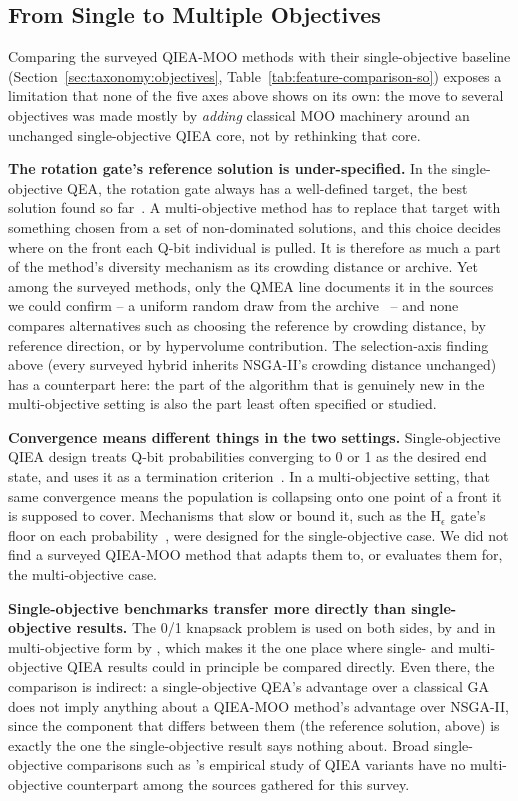 \subsection{From Single to Multiple Objectives}
\label{sec:critical-analysis:so-to-mo}

Comparing the surveyed QIEA-MOO methods with their single-objective
baseline (Section~\ref{sec:taxonomy:objectives},
Table~\ref{tab:feature-comparison-so}) exposes a limitation that none of
the five axes above shows on its own: the move to several objectives was
made mostly by \emph{adding} classical MOO machinery around an unchanged
single-objective QIEA core, not by rethinking that core.

\textbf{The rotation gate's reference solution is under-specified.} In
the single-objective QEA, the rotation gate always has a well-defined
target, the best solution found so far~\citep{han2002qea}. A
multi-objective method has to replace that target with something chosen
from a set of non-dominated solutions, and this choice decides where on
the front each Q-bit individual is pulled. It is therefore as much a
part of the method's diversity mechanism as its crowding distance or
archive. Yet among the surveyed methods, only the QMEA line documents
it in the sources we could confirm -- a uniform random draw from the archive~\citep{ryu2014dmqea} -- and
none compares alternatives such as choosing the reference by crowding
distance, by reference direction, or by hypervolume contribution. The
selection-axis finding above (every surveyed hybrid inherits NSGA-II's
crowding distance unchanged) has a counterpart here: the part of the
algorithm that is genuinely new in the multi-objective setting is also
the part least often specified or studied.

\textbf{Convergence means different things in the two settings.}
Single-objective QIEA design treats Q-bit probabilities converging to 0
or 1 as the desired end state, and uses it as a termination
criterion~\citep{han2004hepsilon}. In a multi-objective setting, that
same convergence means the population is collapsing onto one point of a
front it is supposed to cover. Mechanisms that slow or bound it, such as
the H$_\epsilon$ gate's floor on each probability~\citep{han2004hepsilon},
were designed for the single-objective case. We did not find a surveyed
QIEA-MOO method that adapts them to, or evaluates them for, the
multi-objective case.

\textbf{Single-objective benchmarks transfer more directly than
single-objective results.} The 0/1 knapsack problem is used on both
sides, by \citet{han2002qea} and in multi-objective form by
\citet{kim2006qmea}, which makes it the one place where single- and
multi-objective QIEA results could in principle be compared directly.
Even there, the comparison is indirect: a single-objective QEA's
advantage over a classical GA does not imply anything about a QIEA-MOO
method's advantage over NSGA-II, since the component that differs
between them (the reference solution, above) is exactly the one the
single-objective result says nothing about. Broad single-objective
comparisons such as \citet{zhang2011qieasurvey}'s empirical study of
QIEA variants have no multi-objective counterpart among the sources
gathered for this survey.

